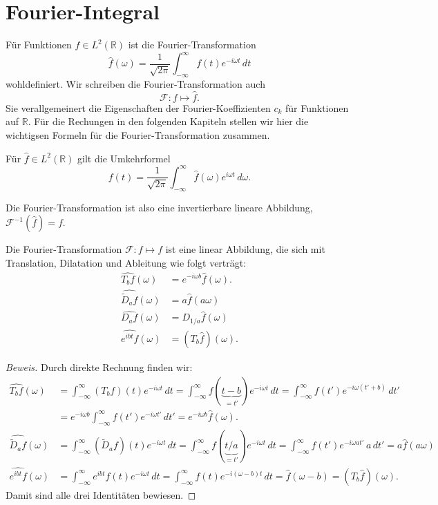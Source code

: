 %
%
%
\section{Fourier-Integral
\label{section:fourier-integral}}
Für Funktionen $f\in L^2(\mathbb R)$ ist die Fourier-Transformation
\[
\hat{f}(\omega)
=
\frac{1}{\sqrt{2\pi}}
\int_{-\infty}^\infty f(t)e^{-i\omega t}\,dt
\]
wohldefiniert.
Wir schreiben die Fourier-Transformation auch
\[
\mathcal{F}\colon f\mapsto \hat{f}.
\]
Sie verallgemeinert die Eigenschaften der Fourier-Koeffizienten $c_k$
für Funktionen auf $\mathbb R$.
Für die Rechungen in den folgenden Kapiteln stellen wir hier die
wichtigsen Formeln für die Fourier-Transformation zusammen.

\begin{satz}
Für $\hat{f}\in L^2(\mathbb R)$ gilt die Umkehrformel
\[
f(t)
=
\frac{1}{\sqrt{2\pi}}
\int_{-\infty}^{\infty} \hat{f}(\omega)e^{i\omega t}\,d\omega.
\]
\end{satz}

Die Fourier-Transformation ist also eine invertierbare lineare Abbildung,
$\mathcal{F}^{-1}(\hat{f}) = f$.

\begin{satz}
Die Fourier-Transformation $\mathcal F\colon f\mapsto f$ ist eine linear
Abbildung, die sich mit Translation, Dilatation und Ableitung wie folgt
verträgt:
\begin{align*}
\widehat{T_bf}(\omega)
&=
e^{-i\omega b}\hat{f}(\omega).
\\
\widehat{\tilde{D}_af}(\omega)
&=
a \hat{f}(a\omega)
\\
\widehat{D_af}(\omega)
&=
D_{1/a}\hat{f}(\omega)
\\
\widehat{e^{ibt}f}(\omega)
&=
(T_b\hat{f})(\omega).
\end{align*}
\end{satz}

\begin{proof}[Beweis]
Durch direkte Rechnung finden wir:
\begin{align*}
\widehat{T_bf}(\omega)
&=
\int_{-\infty}^{\infty} (T_bf)(t)e^{-i\omega t}\,dt
=
\int_{-\infty}^{\infty} f(\underbrace{t-b}_{\displaystyle=t'})e^{-i\omega t}\,dt
=
\int_{-\infty}^{\infty} f(t')e^{-i\omega(t'+b)}\,dt'
\\
&=
e^{-i\omega b}
\int_{-\infty}^{\infty} f(t')e^{-i\omega t'}\,dt'
=
e^{-i\omega b}\hat{f}(\omega).
\\
\widehat{\tilde{D}_af}(\omega)
&=
\int_{-\infty}^\infty (\tilde{D}_af)(t)e^{-i\omega t}\,dt
=
\int_{-\infty}^\infty f(\underbrace{t/a}_{\displaystyle=t'})e^{-i\omega t}\,dt
=
\int_{-\infty}^\infty f(t')e^{-i\omega at'}\,a\,dt'
=
a \hat{f}(a\omega)
\\
\widehat{e^{ibt}f}(\omega)
&=
\int_{-\infty}^\infty e^{ibt}f(t)e^{-i\omega t}\,dt
=
\int_{-\infty}^\infty f(t)e^{-i(\omega -b)t}\,dt
=
\hat{f}(\omega-b)
=
(T_b\hat{f})(\omega).
\end{align*}
Damit sind alle drei Identitäten bewiesen.
\end{proof}

